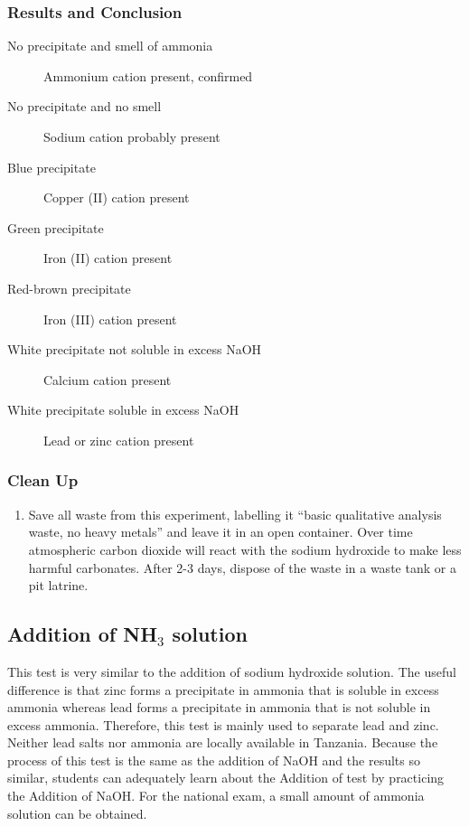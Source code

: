 \subsubsection{Results and Conclusion}
\begin{description}
\item[No precipitate and smell of ammonia]{Ammonium cation present, confirmed}
\item[No precipitate and no smell]{Sodium cation probably present}
\item[Blue precipitate]{Copper (II) cation present}
\item[Green precipitate]{Iron (II) cation present}
\item[Red-brown precipitate]{Iron (III) cation present}
\item[White precipitate not soluble in excess NaOH]{Calcium cation present}
\item[White precipitate soluble in excess NaOH]{Lead or zinc cation present}
\end{description}

\subsubsection{Clean Up}
\begin{enumerate}
\item{Save all waste from this experiment, labelling it ``basic qualitative analysis waste, no heavy metals'' and leave it in an open container. Over time atmospheric carbon dioxide will react with the sodium hydroxide to make less harmful carbonates. After 2-3 days, dispose of the waste in a waste tank or a pit latrine.}
\end{enumerate}

\subsection{Addition of NH$_{3}$ solution}

This test is very similar to the addition of sodium hydroxide solution. The useful difference is that zinc forms a precipitate in ammonia that is soluble in excess ammonia whereas lead forms a precipitate in ammonia that is not soluble in excess ammonia. Therefore, this test is mainly used to separate lead and zinc. Neither lead salts nor ammonia are locally available in Tanzania. Because the process of this test is the same as the addition of NaOH and the results so similar, students can adequately learn about the Addition of  test by practicing the Addition of NaOH. For the national exam, a small amount of ammonia solution can be obtained.

